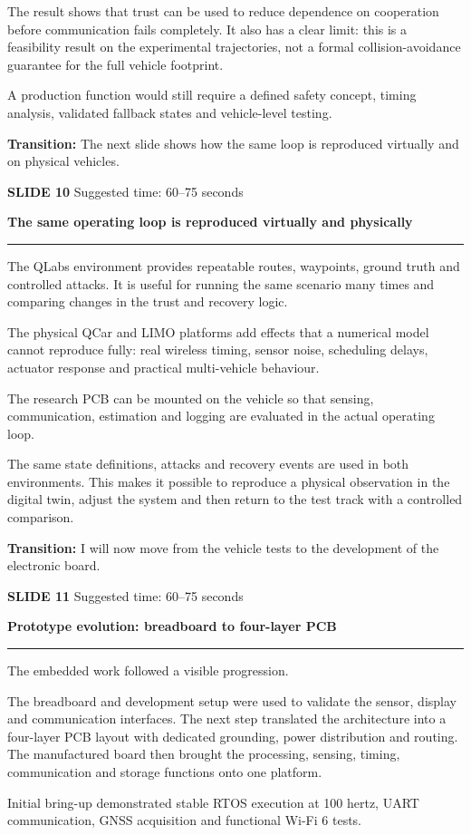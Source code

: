 \documentclass[11pt,a4paper]{article}
\newcommand{\slidetitle}[3]{%
  \clearpage
  {\color{BrandCyan}\large\bfseries SLIDE #1}\hfill
  {\color{Muted}\small Suggested time: #3}\par
  \vspace{0.18cm}
  {\color{BrandBlue}\LARGE\bfseries #2}\par
  \vspace{0.20cm}
  {\color{BrandMagenta}\rule{1.1cm}{1.2pt}}\par
  \vspace{0.12cm}
}
\newcommand{\transition}[1]{%
  \vfill
  \colorbox{Panel}{%
    \parbox{\dimexpr\textwidth-2\fboxsep\relax}{%
      \raggedright\textbf{Transition:} #1}}
}
\begin{document}
The result shows that trust can be used to reduce dependence on cooperation before communication fails completely. It also has a clear limit: this is a feasibility result on the experimental trajectories, not a formal collision-avoidance guarantee for the full vehicle footprint.

A production function would still require a defined safety concept, timing analysis, validated fallback states and vehicle-level testing.

\transition{The next slide shows how the same loop is reproduced virtually and on physical vehicles.}

\slidetitle{10}{The same operating loop is reproduced virtually and physically}{60--75 seconds}

The QLabs environment provides repeatable routes, waypoints, ground truth and controlled attacks. It is useful for running the same scenario many times and comparing changes in the trust and recovery logic.

The physical QCar and LIMO platforms add effects that a numerical model cannot reproduce fully: real wireless timing, sensor noise, scheduling delays, actuator response and practical multi-vehicle behaviour.

The research PCB can be mounted on the vehicle so that sensing, communication, estimation and logging are evaluated in the actual operating loop.

The same state definitions, attacks and recovery events are used in both environments. This makes it possible to reproduce a physical observation in the digital twin, adjust the system and then return to the test track with a controlled comparison.

\transition{I will now move from the vehicle tests to the development of the electronic board.}

\slidetitle{11}{Prototype evolution: breadboard to four-layer PCB}{60--75 seconds}

The embedded work followed a visible progression.

The breadboard and development setup were used to validate the sensor, display and communication interfaces. The next step translated the architecture into a four-layer PCB layout with dedicated grounding, power distribution and routing. The manufactured board then brought the processing, sensing, timing, communication and storage functions onto one platform.

Initial bring-up demonstrated stable RTOS execution at 100 hertz, UART communication, GNSS acquisition and functional Wi-Fi 6 tests.
\end{document}
